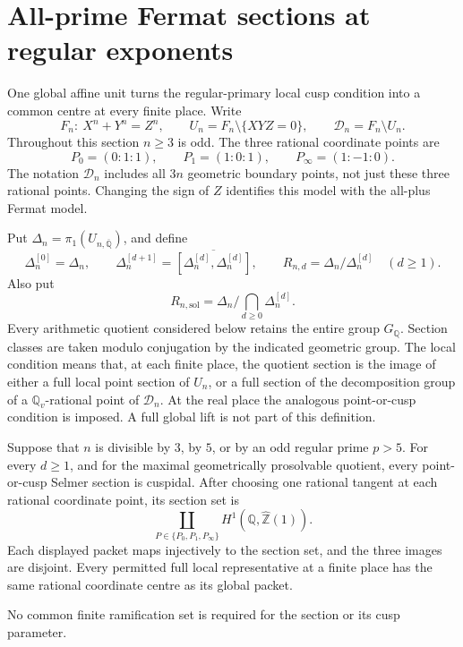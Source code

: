 \section{All-prime Fermat sections at regular exponents}
\label{sec:allprime-regular-bridge}

One global affine unit turns the regular-primary local cusp condition
into a common centre at every finite place. Write
\[
 F_n:\ X^n+Y^n=Z^n,\qquad
 U_n=F_n\setminus\{XYZ=0\},\qquad
 \mathcal D_n=F_n\setminus U_n.
\]
Throughout this section \(n\geq3\) is odd.  The three rational
coordinate points are
\[
 P_0=(0:1:1),\qquad P_1=(1:0:1),\qquad
 P_\infty=(1:-1:0).
\]
The notation \(\mathcal D_n\) includes all \(3n\) geometric boundary
points, not just these three rational points.  Changing the sign of
\(Z\) identifies this model with the all-plus Fermat model.

Put \(\Delta_n=\pi_1(U_{n,\overline{\mathbb Q}})\), and define
\[
 \Delta_n^{[0]}=\Delta_n,\qquad
 \Delta_n^{[d+1]}=
 \overline{[\Delta_n^{[d]},\Delta_n^{[d]}]},\qquad
 R_{n,d}=\Delta_n/\Delta_n^{[d]}\quad(d\geq1).
\]
Also put
\[
 R_{n,\mathrm{sol}}
 =\Delta_n\big/\bigcap_{d\geq0}\Delta_n^{[d]}.
\]
Every arithmetic quotient considered below retains the entire group
\(G_{\mathbb Q}\).  Section classes are taken modulo conjugation by
the indicated geometric group.  The local condition means that,
at each finite place, the quotient section is the image of either
a full local point section of \(U_n\), or a full section of the
decomposition group of a \(\mathbb Q_v\)-rational point of
\(\mathcal D_n\).  At the real place the analogous point-or-cusp
condition is imposed.  A full global lift is not part of this
definition.

\begin{theorem}
\label{thm:allprime-regular-bridge}
Suppose that \(n\) is divisible by \(3\), by \(5\), or by an odd
regular prime \(p>5\).  For every \(d\geq1\), and for the maximal
geometrically prosolvable quotient, every point-or-cusp Selmer
section is cuspidal.  After choosing one rational tangent at each
rational coordinate point, its section set is
\begin{equation}
 \coprod_{P\in\{P_0,P_1,P_\infty\}}
 H^1(\mathbb Q,\widehat{\mathbb Z}(1)).
 \label{eq:allprime-packets}
\end{equation}
Each displayed packet maps injectively to the section set, and
the three images are disjoint.  Every permitted full local
representative at a finite place has the same rational coordinate
centre as its global packet.

No common finite ramification set is required for the section or
its cusp parameter.
\end{theorem}

